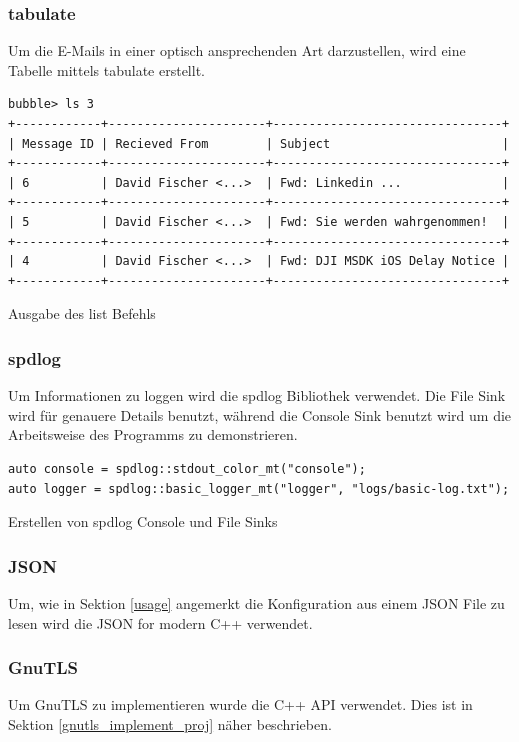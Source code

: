 \documentclass[12pt, letterpaper]{article}
\newenvironment{code}{\captionsetup{type=listing}}{}
\begin{document}
\subsubsection{tabulate}
Um die E-Mails in einer optisch ansprechenden Art darzustellen, wird eine Tabelle mittels tabulate\cite{tabulate_ref} erstellt.

\begin{code}
  \begin{verbatim}
bubble> ls 3
+------------+----------------------+--------------------------------+
| Message ID | Recieved From        | Subject                        | 
+------------+----------------------+--------------------------------+
| 6          | David Fischer <...>  | Fwd: Linkedin ...              | 
+------------+----------------------+--------------------------------+
| 5          | David Fischer <...>  | Fwd: Sie werden wahrgenommen!  |
+------------+----------------------+--------------------------------+
| 4          | David Fischer <...>  | Fwd: DJI MSDK iOS Delay Notice |
+------------+----------------------+--------------------------------+
  \end{verbatim}
  \caption{Ausgabe des list Befehls}
\end{code}

\subsubsection{spdlog}
Um Informationen zu loggen wird die spdlog\cite{spdlog_ref} Bibliothek verwendet. Die File Sink wird für genauere Details benutzt, während die Console Sink benutzt wird um die Arbeitsweise des Programms zu demonstrieren.

\begin{code}
\begin{verbatim}
auto console = spdlog::stdout_color_mt("console");
auto logger = spdlog::basic_logger_mt("logger", "logs/basic-log.txt");
\end{verbatim}
\caption{Erstellen von spdlog Console und File Sinks}
\label{create_gnutls}
\end{code}

\subsubsection{JSON}
Um, wie in Sektion \ref{usage} angemerkt die Konfiguration aus einem JSON File zu lesen wird die JSON for modern C++\cite{json_ref} verwendet.

\subsubsection{GnuTLS}
Um GnuTLS zu implementieren wurde die C++ API verwendet\cite{gnutls_cpp}. Dies ist in Sektion \ref{gnutls_implement_proj} näher beschrieben.
\end{document}
